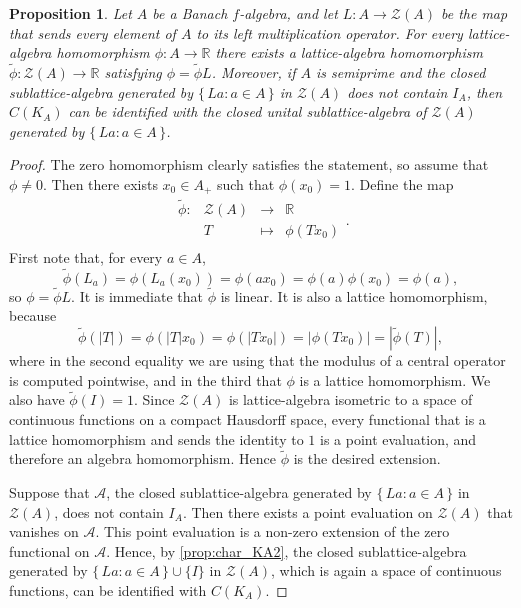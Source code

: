 \documentclass{memo-l}
\newtheorem{prop}[theorem]{Proposition}
\theoremstyle{definition}
\theoremstyle{remark}
\numberwithin{section}{chapter}
\numberwithin{equation}{chapter}
\newcommand\R{\ensuremath{\mathbb{R}}}
\newcommand{\falg}{$f\!$-algebra}
\begin{document}
\begin{prop}\label{prop:KA_center}
    Let $A$ be a Banach \falg, and let $L\colon A\to
    \mathcal{Z}(A)$ be the map that sends every element of $A$ to its left
    multiplication operator. For every lattice-algebra homomorphism
    $\phi \colon A\to \R$ there exists a
    lattice-algebra homomorphism $\tilde \phi \colon \mathcal{Z}(A)\to
    \R$ satisfying $\phi =\tilde \phi L$. Moreover, if $A$ is
    semiprime and the
    closed sublattice-algebra generated by $\{\, La: a \in A  \, \}
    $ in $\mathcal{Z}(A)$ does not contain $I_A$, then $C(K_A)$ can
    be identified with the closed unital sublattice-algebra of
    $\mathcal{Z}(A)$ generated by $\{\, La : a \in A \, \} $.
\end{prop}
\begin{proof}
    The zero homomorphism clearly satisfies the statement, so assume that $\phi \neq 0$.
    Then there exists $x_0 \in A_+$ such that $\phi (x_0)=1$. Define
    the map
    \[
    \begin{array}{cccc}
    \tilde \phi \colon& \mathcal{Z}(A) & \longrightarrow & \R \\
            & T & \longmapsto & \phi (Tx_0) \\
    \end{array}.
    \]
    First note that, for every $a \in A$,
    \[
    \tilde \phi (L_a)=\phi (L_a(x_0))=\phi (ax_0)=\phi (a) \phi
    (x_0)=\phi (a),
    \]
    so $\phi =\tilde \phi L$. It is immediate that $\tilde \phi $ is
    linear. It is also a lattice homomorphism, because
    \[
    \tilde \phi (|T|)=\phi (|T|x_0)=\phi (|Tx_0|)=|\phi (Tx_0)|=|\tilde \phi (T)|,
    \]
    where in the second equality we are using that the modulus of a
    central operator is computed pointwise, and in the third that
    $\phi $ is a lattice homomorphism. We also have $\tilde \phi
    (I)=1$. Since $\mathcal{Z}(A)$ is lattice-algebra isometric to a
    space of continuous functions on a compact Hausdorff space, every
    functional that is a lattice homomorphism and sends the identity
    to $1$ is a point evaluation, and therefore an algebra
    homomorphism. Hence $\tilde \phi $ is the desired extension.

    Suppose that $\mathcal{A}$, the closed sublattice-algebra
    generated by $\{\, La: a \in A  \, \} $ in $\mathcal{Z}(A)$,
    does not contain $I_A$. Then there exists a point evaluation on
    $\mathcal{Z}(A)$ that vanishes on $\mathcal{A}$. This point
    evaluation is a non-zero extension of the zero functional on
    $\mathcal{A}$. Hence, by \cref{prop:char_KA2}, the closed
    sublattice-algebra generated by $\{\, La : a \in A \, \} \cup
    \{I\}$ in $\mathcal{Z}(A)$, which is again a space of continuous
    functions, can be identified with $C(K_A)$.
\end{proof}
\end{document}
